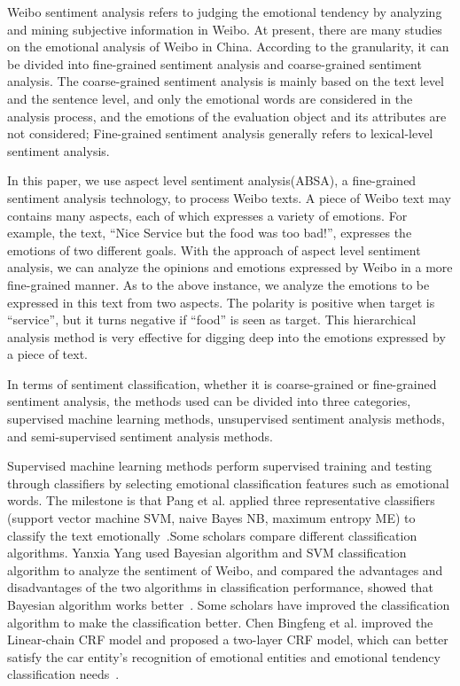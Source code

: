 \documentclass{ieeeaccess}
\begin{document}
Weibo sentiment analysis refers to judging the emotional tendency by analyzing and mining subjective information in Weibo. At present, there are many studies on the emotional analysis of Weibo in China. According to the granularity, it can be divided into fine-grained sentiment analysis and coarse-grained sentiment analysis. The coarse-grained sentiment analysis is mainly based on the text level and the sentence level, and only the emotional words are considered in the analysis process, and the emotions of the evaluation object and its attributes are not considered; Fine-grained sentiment analysis generally refers to lexical-level sentiment analysis.

In this paper, we use aspect level sentiment analysis(ABSA), a fine-grained sentiment analysis technology, to process Weibo texts. A piece of Weibo text may contains many aspects, each of which expresses a variety of emotions. For example, the text, “Nice Service but the food was too bad!”, expresses the emotions of two different goals. With the approach of aspect level sentiment analysis, we can analyze the opinions and emotions expressed by Weibo in a more fine-grained manner. As to the above instance, we analyze the emotions to be expressed in this text from two aspects. The polarity is positive when target is “service”, but it turns negative if “food” is seen as target. This hierarchical analysis method is very effective for digging deep into the emotions expressed by a piece of text.

In terms of sentiment classification, whether it is coarse-grained or fine-grained sentiment analysis, the methods used can be divided into three categories, supervised machine learning methods, unsupervised sentiment analysis methods, and semi-supervised sentiment analysis methods.

Supervised machine learning methods perform supervised training and testing through classifiers by selecting emotional classification features such as emotional words. The milestone is that Pang et al. applied three representative classifiers (support vector machine SVM, naive Bayes NB, maximum entropy ME) to classify the text emotionally~\cite{DBLP:conf/emnlp/PangLV02}.Some scholars compare different classification algorithms. Yanxia Yang used Bayesian algorithm and SVM classification algorithm to analyze the sentiment of Weibo, and compared the advantages and disadvantages of the two algorithms in classification performance, showed that Bayesian algorithm works better~\cite{yang2015microblog}. Some scholars have improved the classification algorithm to make the classification better. Chen Bingfeng et al. improved the Linear-chain CRF model and proposed a two-layer CRF model, which can better satisfy the car entity's recognition of emotional entities and emotional tendency classification needs~\cite{Chen2017A}.
\end{document}
